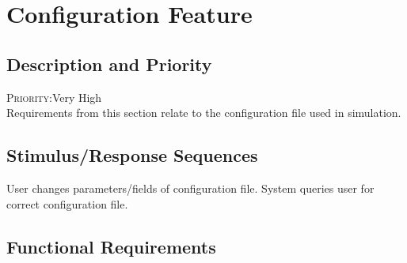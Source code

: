 \section{Configuration Feature} \label{s:system-features:configuration-feature}
	\begin{comment}
		$<$Don’t really say “System Feature 1.” State the feature name in just a few 
		words.$>$
	\end{comment}

\subsection*{Description and Priority}
	\begin{comment}
		$<$Provide a short description of the feature and indicate whether it is of 
		High, Medium, or Low priority. You could also include specific priority 
		component ratings, such as benefit, penalty, cost, and risk (each rated on a 
		relative scale from a low of 1 to a high of 9).$>$
	\end{comment}
	\textsc{Priority:}Very High \\
	Requirements from this section relate to the configuration file used in simulation.
\subsection*{Stimulus/Response Sequences}
	\begin{comment}
		$<$List the sequences of user actions and system responses that stimulate the 
		behavior defined for this feature. These will correspond to the dialog elements 
		associated with use cases.$>$
	\end{comment}
	
	\stimresp
	{User changes parameters/fields of configuration file.}
	{System queries user for correct configuration file.}
	
\subsection*{Functional Requirements}
	\begin{comment}
		$<$Itemize the detailed functional requirements associated with this feature.  
		These are the software capabilities that must be present in order for the user 
		to carry out the services provided by the feature, or to execute the use case.  
		Include how the product should respond to anticipated error conditions or 
		invalid inputs. Requirements should be concise, complete, unambiguous, 
		verifiable, and necessary. Use “TBD” as a placeholder to indicate when necessary 
		information is not yet available.$>$
		
		$<$Each requirement should be uniquely identified with a sequence number or a 
		meaningful tag of some kind.$>$
		
		REQ-1:	REQ-2:
	\end{comment}

